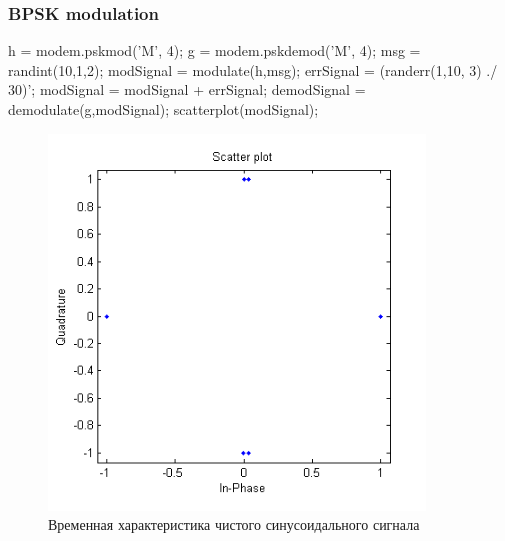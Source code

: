\documentclass[10pt,a4paper]{article}
\begin{document}
\subsubsection{BPSK modulation}
h = modem.pskmod('M', 4);\newline 
g = modem.pskdemod('M', 4); \newline
msg = randint(10,1,2); \newline
modSignal = modulate(h,msg); \newline
errSignal = (randerr(1,10, 3) ./ 30)';\newline 
modSignal = modSignal + errSignal; \newline
demodSignal = demodulate(g,modSignal); \newline
scatterplot(modSignal);\newline
\begin{figure}[h]
\centering
\includegraphics[width=10cm]{1_1.png} 
\caption{Временная характеристика чистого синусоидального сигнала} 
\end{figure}
\newpage
\FloatBarrier
\end{document}
